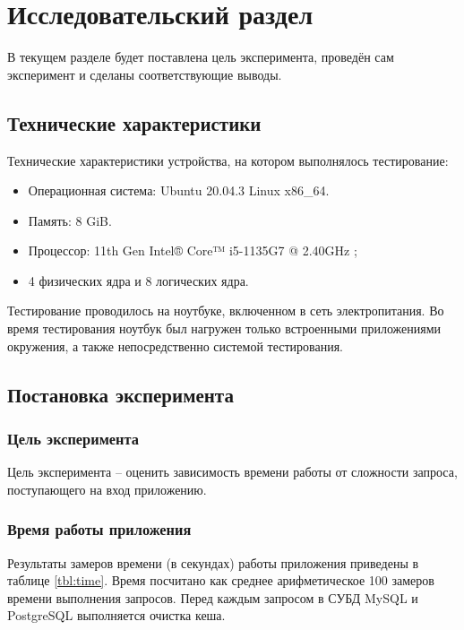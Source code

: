 \chapter{Исследовательский раздел}

В текущем разделе будет поставлена цель эксперимента, проведён сам эксперимент и сделаны соответствующие выводы.

\section{Технические характеристики}

Технические характеристики устройства, на котором выполнялось тестирование:

\begin{itemize}
	\item Операционная система: Ubuntu 20.04.3 \cite{ubuntu} Linux \cite{linux} x86\_64.
	\item Память: 8 GiB.
	\item Процессор: 11th Gen Intel® Core™ i5-1135G7 @ 2.40GHz \cite{intel};
	\item 4 физических ядра и 8 логических ядра.
\end{itemize}

Тестирование проводилось на ноутбуке, включенном в сеть электропитания. Во время тестирования ноутбук был нагружен только встроенными приложениями окружения, а также непосредственно системой тестирования.



\section{Постановка эксперимента}

\subsection{Цель эксперимента}

Цель эксперимента -- оценить зависимость времени работы от сложности запроса, поступающего на вход приложению.

\subsection{Время работы приложения}

Результаты замеров времени (в секундах) работы приложения приведены в таблице \ref{tbl:time}. Время посчитано как среднее арифметическое 100 замеров времени выполнения запросов. Перед каждым запросом в СУБД MySQL и PostgreSQL выполняется очистка кеша.

